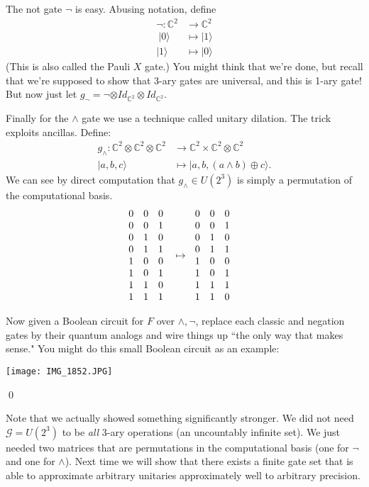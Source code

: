 \documentclass{article}
\begin{document}
The not gate $\neg$ is easy.  Abusing notation, define
\begin{align*}
	\neg : {\mathds{C}}^{2} &\to {\mathds{C}}^{2}\\\ 
|0\rangle &\mapsto |1\rangle\\
|1\rangle &\mapsto |0\rangle
\end{align*}
(This is also called the Pauli $X$ gate.)  You might think that we're done, but recall that we're supposed to show that 3-ary gates are universal, and this is 1-ary gate!  But now just let $ g_{\neg}=\neg \otimes Id_{{\mathds{C}}^{2}}\otimes Id_{{\mathds{C}}^{2}}$.

Finally for the $ \wedge$ gate we use a technique called unitary dilation. The trick exploits ancillas. Define:
\begin{align*}
	g_{\wedge}:{{\mathds{C}}^{2}} \otimes {{\mathds{C}}^{2}} \otimes {{\mathds{C}}^{2}} &\to {{\mathds{C}}^{2}} \times {{\mathds{C}}^{2}} \otimes {{\mathds{C}}^{2}}\\[1em]
	|a,b,c\rangle &\mapsto |a,b,(a \wedge b) \oplus c\rangle. 
\end{align*}
We can see by direct computation that $ g_{\wedge} \in U(2^{3})$ is simply a permutation of the computational basis.
\begin{align*}
\begin{array}{@{}cccc@{}}
0 & 0 & 0 &   \\
0 & 0 & 1 &  \\
0 & 1 & 0 & \\
0 & 1 & 1 &  \\
1 & 0 & 0 &  \\
1 & 0 & 1 &   \\
1 & 1 & 0 &  \\
1 & 1 & 1 & 
\end{array} \mapsto \ \ \begin{array}{@{}cccc@{}}
0 & 0 & 0 &   \\
0 & 0 & 1 &  \\
0 & 1 & 0 & \\
0 & 1 & 1 &  \\
1 & 0 & 0 &  \\
1 & 0 & 1 &   \\
1 & 1 & 1 &  \\
1 & 1 & 0 & 
\end{array}
\end{align*}

Now given a Boolean circuit for $F$ over $ \wedge,\neg$, replace each classic and negation gates by their quantum analogs and wire things up ``the only way that makes sense."  You might do this small Boolean circuit as an example:
\begin{center}
 \texttt{[image: IMG\_1852.JPG]}
\end{center}
\qed

Note that we actually showed something significantly stronger.  We did not need $\mathscr{G} = U(2^3)$ to be \emph{all} 3-ary operations (an uncountably infinite set).  We just needed two matrices that are permutations in the computational basis (one for $\neg$ and one for $\wedge$).  Next time we will show that there exists a finite gate set that is able to approximate arbitrary unitaries approximately well to arbitrary precision.
\end{document}
